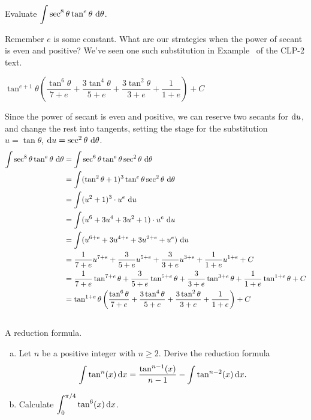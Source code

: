 \begin{Mquestion}
Evaluate $\displaystyle\int \sec^{8}\theta \tan^{e}\theta ~\mathrm{d}\theta$.
\end{Mquestion}
\begin{hint}
Remember $e$ is some constant. What are our strategies when the power of secant is even and positive? We've seen one such substitution in Example~
of the CLP-2 text.
\end{hint}
\begin{answer}
$\tan^{e+1}\theta\left(
\dfrac{\tan^{6}\theta}{7+e}+\dfrac{3\tan^4\theta}{5+e}+\dfrac{3\tan^2\theta}{3+e}+\dfrac{1}{1+e}
\right)+C$
\end{answer}
\begin{solution}
Since the power of secant is even and positive, we can reserve two secants for $\mathrm{d}u$, and change the rest into tangents, setting the stage for the substitution $u = \tan \theta$, $\mathrm{d}u=\sec^2 \theta~\mathrm{d}\theta$.
\begin{align*}
\int \sec^{8}\theta \tan^{e}\theta ~\mathrm{d}\theta&=\int \sec^6 \theta \tan^e \theta \sec^2 \theta~\mathrm{d}\theta\\
&=\int (\tan^2 \theta +1)^3  \tan^e \theta \sec^2 \theta~\mathrm{d}\theta\\
&=\int (u^2+1)^3 \cdot u^e ~\mathrm{d}u\\
&=\int (u^6+3u^4 +3u^2+1) \cdot u^e ~\mathrm{d}u\\
&=\int (u^{6+e}+3u^{4+e} +3u^{2+e}+ u^e) ~\mathrm{d}u\\
&=\frac{1}{7+e}u^{7+e}+\frac{3}{5+e}u^{5+e}+\frac{3}{3+e}u^{3+e}+\frac{1}{1+e}u^{1+e}+C
\\
&=\frac{1}{7+e}\tan^{7+e}\theta+\frac{3}{5+e}\tan^{5+e}\theta+\frac{3}{3+e}\tan^{3+e}\theta+\frac{1}{1+e}\tan^{1+e}\theta+C\\
&=\tan^{1+e}\theta\left(
\frac{\tan^{6}\theta}{7+e}+\frac{3\tan^4\theta}{5+e}+\frac{3\tan^2\theta}{3+e}+\frac{1}{1+e}
\right)+C
\end{align*}
\end{solution}





\subsection*{\Application}



\begin{Mquestion}[2001D]
A reduction formula.
\begin{enumerate}[(a)]
\item
Let $n$ be a positive integer with $n\ge 2$.
Derive the reduction formula
\[\int\tan^n(x)\,\mathrm{d}x=\frac{\tan^{n-1}(x)}{n-1}
-\int\tan^{n-2}(x)\,\mathrm{d}x.\]
\item
Calculate $\displaystyle\int_0^{\pi/4}\tan^6(x)\,\mathrm{d}x$.
\end{enumerate}
\end{Mquestion}

